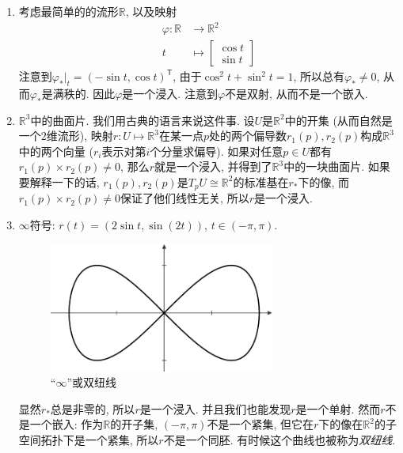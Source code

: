 \begin{eg}\label{submanifold_eg}
    \begin{enumerate}[(1)]
        \item 考虑最简单的的流形$\mathbb{R}$, 以及映射
        \begin{align*}
            \varphi:\mathbb{R}&\to\mathbb{R}^2\\
            t&\mapsto\begin{bmatrix}
                \cos{t}\\ \sin{t}
            \end{bmatrix}
        \end{align*}
        注意到$\varphi_*|_t=(-\sin{t},\cos{t})^\mathsf{T}$, 由于$\cos^2t+\sin^2t=1$, 所以总有$\varphi_*\neq 0$, 从而$\varphi_*$是满秩的.
        因此$\varphi$是一个浸入.
        注意到$\varphi$不是双射, 从而不是一个嵌入.
        \item $\mathbb{R}^3$中的曲面片.
        我们用古典的语言来说这件事.
        设$U$是$\mathbb{R}^2$中的开集 (从而自然是一个$2$维流形), 映射$r:U\mapsto\mathbb{R}^3$在某一点$p$处的两个偏导数$r_1(p),r_2(p)$构成$\mathbb{R}^3$中的两个向量 ($r_i$表示对第$i$个分量求偏导).
        如果对任意$p\in U$都有$r_1(p)\times r_2(p)\neq 0$, 那么$r$就是一个浸入, 并得到了$\mathbb{R}^3$中的一块曲面片.
        如果要解释一下的话, $r_1(p),r_2(p)$是$T_pU\cong\mathbb{R}^2$的标准基在$r_*$下的像, 而$r_1(p)\times r_2(p)\neq 0$保证了他们线性无关, 所以$r$是一个浸入.
        \item $\infty$符号: $r(t)=(2\sin{t},\sin(2t))$, $t\in(-\pi,\pi)$.
        \begin{figure}[ht]
            \centering
            \includegraphics[width=0.7\textwidth]{figures/lemniscate.pdf}
            \caption{``$\infty$''或双纽线}
        \end{figure}
        显然$r_*$总是非零的, 所以$r$是一个浸入.
        并且我们也能发现$r$是一个单射.
        然而$r$不是一个嵌入: 作为$\mathbb{R}$的开子集, $(-\pi,\pi)$不是一个紧集, 但它在$r$下的像在$\mathbb{R}^2$的子空间拓扑下是一个紧集, 所以$r$不是一个同胚.
        有时候这个曲线也被称为\textit{双纽线}.
    \end{enumerate}
\end{eg}

